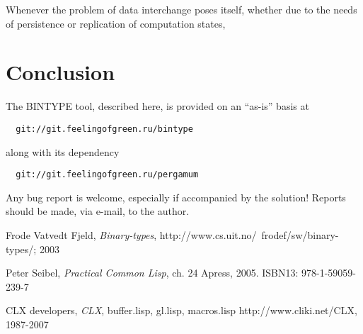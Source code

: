 \documentclass[%
	final,
	notitlepage,
	narroweqnarray,
	inline,
	twoside,
	]{ieee}
\begin{document}
\PARstartCal Whenever the problem of data interchange poses itself,
whether due to the needs of persistence or replication of computation states, 


\section{Conclusion}

The BINTYPE tool, described here, is provided on an ``as-is'' basis at

\begin{verbatim}
  git://git.feelingofgreen.ru/bintype
\end{verbatim}

\noindent along with its dependency

\begin{verbatim}
  git://git.feelingofgreen.ru/pergamum
\end{verbatim}

\noindent Any bug report is welcome, especially if accompanied by the solution!
Reports should be made, via e-mail, to the author.

%
%
%
%
%

\begin{thebibliography}{1}

Frode Vatvedt Fjeld, {\em Binary-types},
\newblock http://www.cs.uit.no/~frodef/sw/binary-types/; 2003

Peter Seibel, {\em Practical Common Lisp}, ch. 24
\newblock Apress, 2005. ISBN13: 978-1-59059-239-7

CLX developers, {\em CLX}, buffer.lisp, gl.lisp, macros.lisp
\newblock http://www.cliki.net/CLX, 1987-2007

\end{thebibliography}
\end{document}
